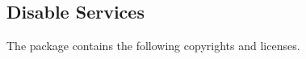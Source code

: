 %
%
% 
% 
% 
% 
%

\subsection{Disable Services}

The  package contains the following copyrights
and licenses.

